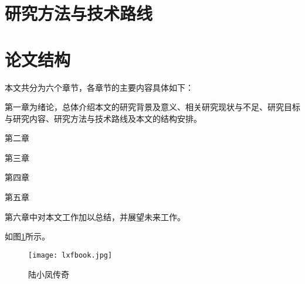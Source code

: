 \section{研究方法与技术路线}

\section{论文结构}
本文共分为六个章节，各章节的主要内容具体如下：

第一章为绪论，总体介绍本文的研究背景及意义、相关研究现状与不足、研究目标
与研究内容、研究方法与技术路线及本文的结构安排。

第二章

第三章

第四章

第五章

第六章中对本文工作加以总结，并展望未来工作。

如图\ref{lxfbook}所示。

\begin{figure}
    \centering
    \texttt{[image: lxfbook.jpg]}
    \caption{陆小凤传奇\label{lxfbook}}
\end{figure}
